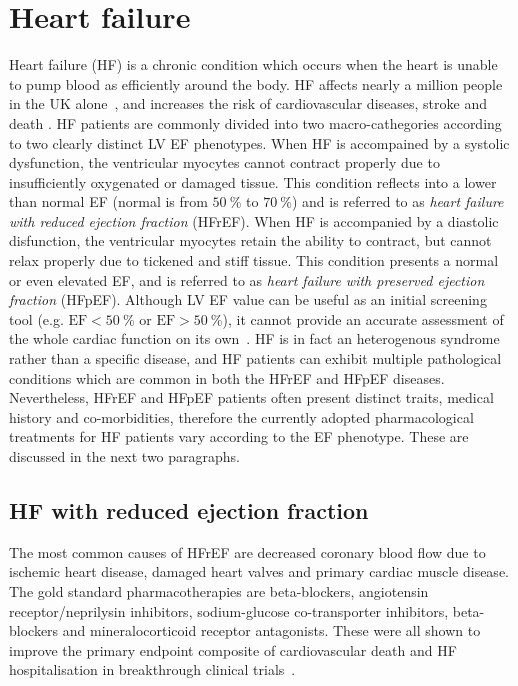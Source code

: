 %
%
%
\section{Heart failure}\label{sec:ch1heart_failure}
Heart failure (\acs{HF}) is a chronic condition which occurs when the heart is unable to pump blood as efficiently around the body. HF affects nearly a million people in the UK alone~\cite{Bhf:2021}, and increases the risk of cardiovascular diseases, stroke and death \cite{Adelborg:2017, Henkel:2008}. HF patients are commonly divided into two macro-cathegories according to two clearly distinct LV EF phenotypes. When HF is accompained by a systolic dysfunction, the ventricular myocytes cannot contract properly due to insufficiently oxygenated or damaged tissue. This condition reflects into a lower than normal EF (normal is from $\SI{50}{\percent}$ to $\SI{70}{\percent}$) and is referred to as \textit{heart failure with reduced ejection fraction} (\acs{HFrEF}). When HF is accompanied by a diastolic disfunction, the ventricular myocytes retain the ability to contract, but cannot relax properly due to tickened and stiff tissue. This condition presents a normal or even elevated EF, and is referred to as \textit{heart failure with preserved ejection fraction} (\acs{HFpEF}). Although LV EF value can be useful as an initial screening tool (e.g. $\textrm{EF}<\SI{50}{\percent}$ or $\textrm{EF}>\SI{50}{\percent}$), it cannot provide an accurate assessment of the whole cardiac function on its own~\cite{Guyton:2021}. HF is in fact an heterogenous syndrome rather than a specific disease, and HF patients can exhibit multiple pathological conditions which are common in both the HFrEF and HFpEF diseases. Nevertheless, HFrEF and HFpEF patients often present distinct traits, medical history and co-morbidities, therefore the currently adopted pharmacological treatments for HF patients vary according to the EF phenotype. These are discussed in the next two paragraphs.


%
%
%
\subsection{HF with reduced ejection fraction}\label{sec:ch1HF_with_reduced_ejection_fraction}
The most common causes of HFrEF are decreased coronary blood flow due to ischemic heart disease, damaged heart valves and primary cardiac muscle disease. The gold standard pharmacotherapies are beta-blockers, angiotensin receptor/neprilysin inhibitors, sodium-glucose co-transporter inhibitors, beta-blockers and mineralocorticoid receptor antagonists. These were all shown to improve the primary endpoint composite of cardiovascular death and HF hospitalisation in breakthrough clinical trials~\cite{Debska-Kozlowska:2021}.

